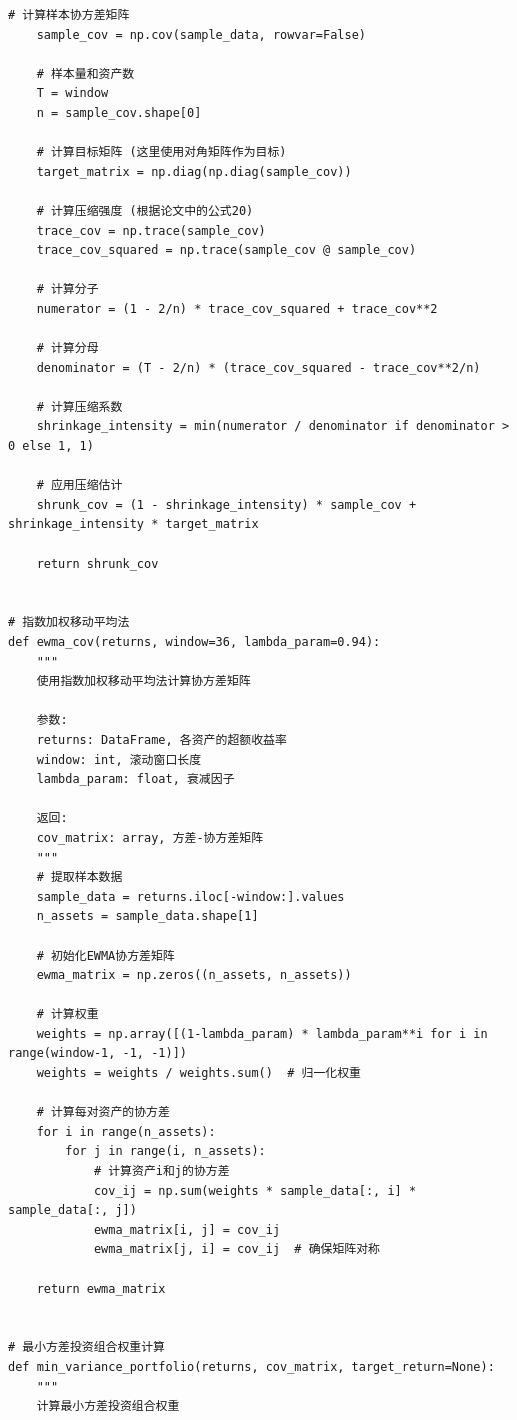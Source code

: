 \documentclass[12pt, a4paper]{article}
\begin{document}
\begin{lstlisting}[basicstyle=\small\ttfamily, breaklines=true, columns=fullflexible]
    # 计算样本协方差矩阵
    sample_cov = np.cov(sample_data, rowvar=False)
    
    # 样本量和资产数
    T = window
    n = sample_cov.shape[0]
    
    # 计算目标矩阵 (这里使用对角矩阵作为目标)
    target_matrix = np.diag(np.diag(sample_cov))
    
    # 计算压缩强度 (根据论文中的公式20)
    trace_cov = np.trace(sample_cov)
    trace_cov_squared = np.trace(sample_cov @ sample_cov)
    
    # 计算分子
    numerator = (1 - 2/n) * trace_cov_squared + trace_cov**2
    
    # 计算分母
    denominator = (T - 2/n) * (trace_cov_squared - trace_cov**2/n)
    
    # 计算压缩系数
    shrinkage_intensity = min(numerator / denominator if denominator > 0 else 1, 1)
    
    # 应用压缩估计
    shrunk_cov = (1 - shrinkage_intensity) * sample_cov + shrinkage_intensity * target_matrix
    
    return shrunk_cov


# 指数加权移动平均法
def ewma_cov(returns, window=36, lambda_param=0.94):
    """
    使用指数加权移动平均法计算协方差矩阵
    
    参数:
    returns: DataFrame, 各资产的超额收益率
    window: int, 滚动窗口长度
    lambda_param: float, 衰减因子
    
    返回:
    cov_matrix: array, 方差-协方差矩阵
    """
    # 提取样本数据
    sample_data = returns.iloc[-window:].values
    n_assets = sample_data.shape[1]
    
    # 初始化EWMA协方差矩阵
    ewma_matrix = np.zeros((n_assets, n_assets))
    
    # 计算权重
    weights = np.array([(1-lambda_param) * lambda_param**i for i in range(window-1, -1, -1)])
    weights = weights / weights.sum()  # 归一化权重
    
    # 计算每对资产的协方差
    for i in range(n_assets):
        for j in range(i, n_assets):
            # 计算资产i和j的协方差
            cov_ij = np.sum(weights * sample_data[:, i] * sample_data[:, j])
            ewma_matrix[i, j] = cov_ij
            ewma_matrix[j, i] = cov_ij  # 确保矩阵对称
    
    return ewma_matrix


# 最小方差投资组合权重计算
def min_variance_portfolio(returns, cov_matrix, target_return=None):
    """
    计算最小方差投资组合权重
    

\end{lstlisting}
\end{document}
